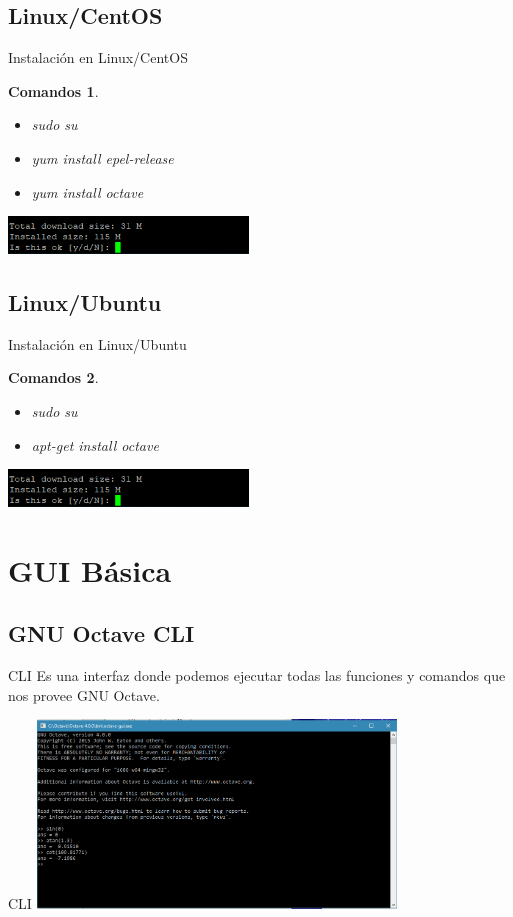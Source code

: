 \documentclass[12pt]{beamer}
\newtheorem{command}{Comandos}
\begin{document}
\subsection{Linux/CentOS}
\begin{frame}{Instalación en Linux/CentOS}
\begin{command}
	\begin{itemize}
		\item sudo su
		\item yum install epel-release
		\item yum install octave
	\end{itemize}
\end{command}
\includegraphics[height=1cm]{images/imagen_centos.png}
\end{frame}
\subsection{Linux/Ubuntu}
\begin{frame}{Instalación en Linux/Ubuntu}
\begin{command}
	\begin{itemize}
		\item sudo su
		\item apt-get install octave
	\end{itemize}
\end{command}
\includegraphics[height=1cm]{images/imagen_centos.png}
\end{frame}

\section{GUI Básica}
\subsection{GNU Octave CLI}
\begin{frame}{CLI}
Es una interfaz donde podemos ejecutar todas las funciones y comandos que nos provee GNU Octave.
\end{frame}
\begin{frame}{CLI}
\includegraphics[width=270pt]{images/cli.png}
\end{frame}
\end{document}
